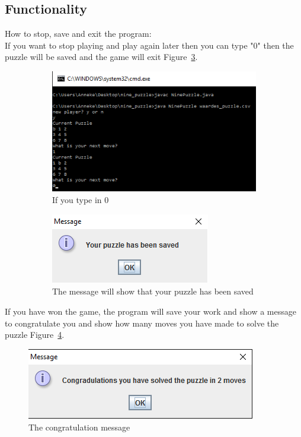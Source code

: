 \documentclass[10pt]{article}
\begin{document}
\subsection{Functionality}
How to stop, save and exit the program:
\\If you want to stop playing and play again later then you can type "0" then the puzzle will be saved and the game will exit Figure~\ref{2}.
\begin{figure}[b!]
    \centering
    \begin{subfigure}[b]{0.5\textwidth}
        \centering
        \includegraphics[scale=0.8]{./Prente/prent4.png}
        \caption{If you type in 0}
        \label{prent4}
    \end{subfigure}%
 
    \begin{subfigure}[b]{0.5\textwidth}
        \centering
        \includegraphics[scale=0.8]{./Prente/prent5.png}
        \caption{The message will show that your puzzle has been saved}
        \label{prent5}
    \end{subfigure}
    \caption{\label{2}}
   \end{figure}
   
If you have won the game, the program will save your work and show a message to congratulate you and show how many moves you have made to solve the puzzle Figure~\ref{prent6}.
\begin{figure}
\centering
\includegraphics[scale=0.8]{./Prente/prent6.png}
\caption{The congratulation message}
\label{prent6}
\end{figure}
\end{document}
